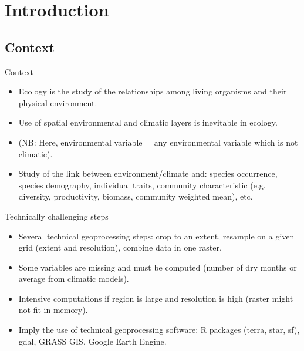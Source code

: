 \documentclass[10pt,table,dvipsnames,compress]{beamer}
\begin{document}
\section{Introduction}
\label{sec:orgda4b978}

\subsection{Context}
\label{sec:org2bb18b9}

\begin{frame}[label={sec:org4fc8ea7}]{Context}
\begin{itemize}
\item Ecology is the study of the relationships among living organisms and their physical environment.
\item Use of spatial environmental and climatic layers is inevitable in ecology.
\item (NB: Here, environmental variable = any environmental variable which is not climatic).
\item Study of the link between environment/climate and: species occurrence, species demography, individual traits, community characteristic (e.g. diversity, productivity, biomass, community weighted mean), etc.
\end{itemize}
\end{frame}

\begin{frame}[label={sec:orgb213867}]{Technically challenging steps}
\begin{itemize}
\item Several technical geoprocessing steps: crop to an extent, resample on a given grid (extent and resolution), combine data in one raster.
\item Some variables are missing and must be computed (number of dry months or average from climatic models).
\item Intensive computations if region is large and resolution is high (raster might not fit in memory).
\item Imply the use of technical geoprocessing software: R packages (terra, star, sf), gdal, GRASS GIS, Google Earth Engine.
\end{itemize}
\end{frame}
\end{document}

